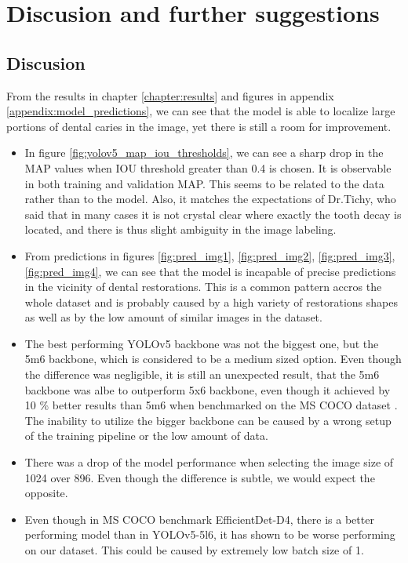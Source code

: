 \chapter{Discusion and further suggestions}
\section{Discusion}
From the results in chapter \ref{chapter:results} and figures in appendix \ref{appendix:model_predictions}, we can see that the model is able to localize large portions of dental caries in the image, yet there is still a room for improvement.

\begin{itemize}
    \item In figure \ref{fig:yolov5_map_iou_thresholds}, we can see a sharp drop in the MAP values when IOU threshold greater than 0.4 is chosen. It is observable in both training and validation MAP. This seems to be related to the data rather than to the model. Also, it matches the expectations of Dr.Tichy, who said that in many cases it is not crystal clear where exactly the tooth decay is located, and there is thus slight ambiguity in the image labeling.
    \item From predictions in figures \ref{fig:pred_img1}, \ref{fig:pred_img2}, \ref{fig:pred_img3}, \ref{fig:pred_img4}, we can see that the model is incapable of precise predictions in the vicinity of dental restorations. This is a common pattern accros the whole dataset and is probably caused by a high variety of restorations shapes as well as by the low amount of similar images in the dataset.
    \item The best performing YOLOv5 backbone was not the biggest one, but the 5m6 backbone, which is considered to be a medium sized option. Even though the difference was negligible, it is still an unexpected result, that the 5m6 backbone was albe to outperform 5x6 backbone, even though it achieved by 10 \% better results than 5m6 when benchmarked on the MS COCO dataset \cite{glennjocher2020}. The inability to utilize the bigger backbone can be caused by a wrong setup of the training pipeline or the low amount of data.
    \item There was a drop of the model performance when selecting the image size of 1024 over 896. Even though the difference is subtle, we would expect the opposite.
    \item Even though in MS COCO benchmark EfficientDet-D4, there is a better performing model than in YOLOv5-5l6, it has shown to be worse performing on our dataset. This could be caused by extremely low batch size of 1.
\end{itemize}
